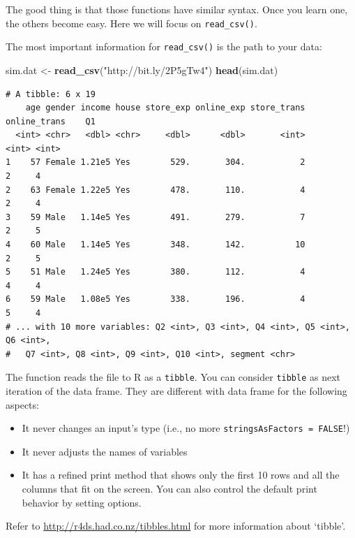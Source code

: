 \documentclass[12pt,]{krantz}
\makeatletter
\newenvironment{Shaded}{\begin{snugshade}}{\end{snugshade}}
\newcommand{\KeywordTok}[1]{\textcolor[rgb]{0.27,0.27,0.27}{\textbf{#1}}}
\newcommand{\NormalTok}[1]{#1}
\newcommand{\StringTok}[1]{\textcolor[rgb]{0.5,0.5,0.5}{#1}}
\providecommand{\tightlist}{%
  \setlength{\itemsep}{0pt}\setlength{\parskip}{0pt}}
\newenvironment{kframe}{%
\medskip{}
\setlength{\fboxsep}{.8em}
 \def\at@end@of@kframe{}%
 \ifinner\ifhmode%
  \def\at@end@of@kframe{\end{minipage}}%
  \begin{minipage}{\columnwidth}%
 \fi\fi%
 \def\FrameCommand##1{\hskip\@totalleftmargin \hskip-\fboxsep
 \colorbox{shadecolor}{##1}\hskip-\fboxsep
     \hskip-\linewidth \hskip-\@totalleftmargin \hskip\columnwidth}%
 \MakeFramed {\advance\hsize-\width
   \@totalleftmargin\z@ \linewidth\hsize
   \@setminipage}}%
 {\par\unskip\endMakeFramed%
 \at@end@of@kframe}
\renewenvironment{Shaded}{\begin{kframe}}{\end{kframe}}
\makeatother
\begin{document}
The good thing is that those functions have similar syntax. Once you learn one, the others become easy. Here we will focus on \texttt{read\_csv()}.

The most important information for \texttt{read\_csv()} is the path to your data:

\begin{Shaded}
\begin{Highlighting}[]
\NormalTok{sim.dat <-}\StringTok{ }\KeywordTok{read_csv}\NormalTok{(}\StringTok{"http://bit.ly/2P5gTw4"}\NormalTok{)}
\KeywordTok{head}\NormalTok{(sim.dat)}
\end{Highlighting}
\end{Shaded}

\begin{verbatim}
# A tibble: 6 x 19
    age gender income house store_exp online_exp store_trans online_trans    Q1
  <int> <chr>   <dbl> <chr>     <dbl>      <dbl>       <int>        <int> <int>
1    57 Female 1.21e5 Yes        529.       304.           2            2     4
2    63 Female 1.22e5 Yes        478.       110.           4            2     4
3    59 Male   1.14e5 Yes        491.       279.           7            2     5
4    60 Male   1.14e5 Yes        348.       142.          10            2     5
5    51 Male   1.24e5 Yes        380.       112.           4            4     4
6    59 Male   1.08e5 Yes        338.       196.           4            5     4
# ... with 10 more variables: Q2 <int>, Q3 <int>, Q4 <int>, Q5 <int>, Q6 <int>,
#   Q7 <int>, Q8 <int>, Q9 <int>, Q10 <int>, segment <chr>
\end{verbatim}

The function reads the file to R as a \texttt{tibble}. You can consider \texttt{tibble} as next iteration of the data frame. They are different with data frame for the following aspects:

\begin{itemize}
\tightlist
\item
  It never changes an input's type (i.e., no more \texttt{stringsAsFactors\ =\ FALSE}!)
\item
  It never adjusts the names of variables
\item
  It has a refined print method that shows only the first 10 rows and all the columns that fit on the screen. You can also control the default print behavior by setting options.
\end{itemize}

Refer to \url{http://r4ds.had.co.nz/tibbles.html} for more information about `tibble'.
\end{document}
